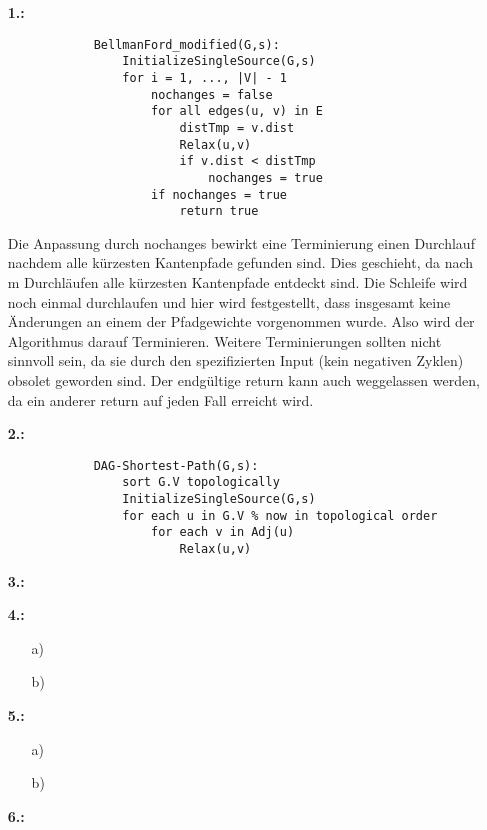 \documentclass[a4paper,11pt,fleqn]{scrartcl}
\title{\titleinfo}
\author{\authorinfo}
\begin{document}
	\maketitle
	\begin{enumerate}
		\item[\textbf{1.:}] \quad \\
		\begin{verbatim}
			BellmanFord_modified(G,s):
			    InitializeSingleSource(G,s)
			    for i = 1, ..., |V| - 1
			        nochanges = false
			        for all edges(u, v) in E
			            distTmp = v.dist
			            Relax(u,v)
			            if v.dist < distTmp
			                nochanges = true
			        if nochanges = true
			            return true
		\end{verbatim}
		
		Die Anpassung durch nochanges bewirkt eine Terminierung einen Durchlauf nachdem alle kürzesten
		Kantenpfade gefunden sind. Dies geschieht, da nach m Durchläufen alle kürzesten Kantenpfade entdeckt sind.
		Die Schleife wird noch einmal durchlaufen und hier wird festgestellt, dass insgesamt keine Änderungen
		an einem der Pfadgewichte vorgenommen wurde. Also wird der Algorithmus darauf Terminieren.
		Weitere Terminierungen sollten nicht sinnvoll sein, da sie durch den spezifizierten Input (kein negativen 	
		Zyklen) obsolet geworden sind. Der endgültige return kann auch weggelassen werden, da ein anderer return 
		auf jeden Fall erreicht wird.
		\item[\textbf{2.:}] \quad \\
			\begin{verbatim}
			DAG-Shortest-Path(G,s):
			    sort G.V topologically
			    InitializeSingleSource(G,s)
			    for each u in G.V % now in topological order
			        for each v in Adj(u)
			            Relax(u,v)
		\end{verbatim}
		\item[\textbf{3.:}] \quad \\
			\todo
		\item[\textbf{4.:}]
		\begin{enumerate}
			\item[a)] \quad \\
				\todo
			\item[b)] \quad \\
				\todo
		\end{enumerate}
		\item[\textbf{5.:}]
		\begin{enumerate}
			\item[a)] \quad \\
				\todo
			\item[b)] \quad \\
				\todo
		\end{enumerate}
		\item[\textbf{6.:}] \quad \\
			\todo
	\end{enumerate}
\end{document}
